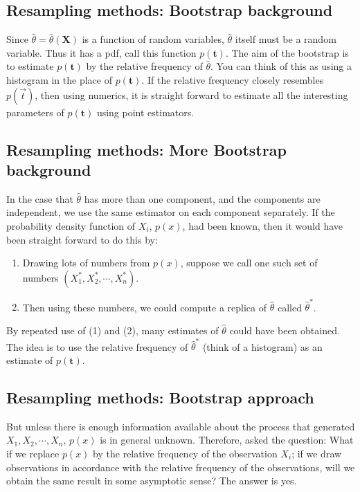 \documentclass[letterpaper,10pt,english]{sphinxmanual}
\begin{document}
\subsection{Resampling methods: Bootstrap background}
\label{\detokenize{chapter4:resampling-methods-bootstrap-background}}
Since \(\widehat{\theta} = \widehat{\theta}(\boldsymbol{X})\) is a function of random variables,
\(\widehat{\theta}\) itself must be a random variable. Thus it has
a pdf, call this function \(p(\boldsymbol{t})\). The aim of the bootstrap is to
estimate \(p(\boldsymbol{t})\) by the relative frequency of
\(\widehat{\theta}\). You can think of this as using a histogram
in the place of \(p(\boldsymbol{t})\). If the relative frequency closely
resembles \(p(\vec{t})\), then using numerics, it is straight forward to
estimate all the interesting parameters of \(p(\boldsymbol{t})\) using point
estimators.


\subsection{Resampling methods: More Bootstrap background}
\label{\detokenize{chapter4:resampling-methods-more-bootstrap-background}}
In the case that \(\widehat{\theta}\) has
more than one component, and the components are independent, we use the
same estimator on each component separately.  If the probability
density function of \(X_i\), \(p(x)\), had been known, then it would have
been straight forward to do this by:
\begin{enumerate}
%
\item {} 
Drawing lots of numbers from \(p(x)\), suppose we call one such set of numbers \((X_1^*, X_2^*, \cdots, X_n^*)\).

\item {} 
Then using these numbers, we could compute a replica of \(\widehat{\theta}\) called \(\widehat{\theta}^*\).

\end{enumerate}

By repeated use of (1) and (2), many
estimates of \(\widehat{\theta}\) could have been obtained. The
idea is to use the relative frequency of \(\widehat{\theta}^*\)
(think of a histogram) as an estimate of \(p(\boldsymbol{t})\).


\subsection{Resampling methods: Bootstrap approach}
\label{\detokenize{chapter4:resampling-methods-bootstrap-approach}}
But
unless there is enough information available about the process that
generated \(X_1,X_2,\cdots,X_n\), \(p(x)\) is in general
unknown. Therefore,   asked the
question: What if we replace \(p(x)\) by the relative frequency
of the observation \(X_i\); if we draw observations in accordance with
the relative frequency of the observations, will we obtain the same
result in some asymptotic sense? The answer is yes.
\end{document}
